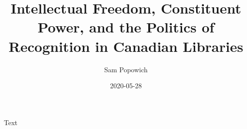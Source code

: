 \documentclass{book}
\title{Intellectual Freedom, Constituent Power, and the Politics of
Recognition in Canadian Libraries}
\date{2020-05-28}
\author{Sam Popowich}
\begin{document}
  \maketitle
  \newpage
  Text
\end{document}

